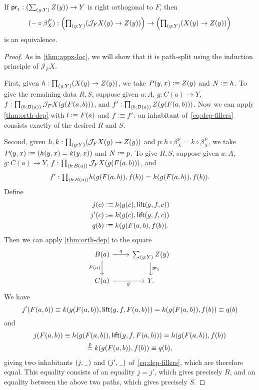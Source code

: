 \begin{lem}\label{thm:appx-factsys}
  If $\proj1 : (\sm{y:Y} Z(y)) \to Y$ is right orthogonal to $F$, then
  \[(-\circ \beta^F_X) : \Big(\prd{y:Y} (\mathcal{J}_F X(y) \to Z(y))\Big) \to \Big(\prd{y:Y} (X(y) \to Z(y))\Big) \]
  is an equivalence.
\end{lem}
\begin{proof}
  As in \cref{thm:appx-loc}, we will show that it is path-split using the induction principle of $\mathcal{J}_F X$.

  First, given $h:\prd{y:Y} (X(y) \to Z(y))$, we take $P(y,x) \vcentcolon\equiv Z(y)$ and $N\vcentcolon\equiv h$.
  To give the remaining data $R,S$, suppose given $a:A$, $g:C(a) \to Y$, $f:\prd{b:B(a)} \mathcal{J}_F X(g(F(a,b)))$, and $f':\prd{b:B(a)} Z(g(F(a,b)))$.
  Now we can apply \cref{thm:orth-dep} with $l\vcentcolon\equiv F(a)$ and $f\vcentcolon\equiv f'$: an inhabitant of~\eqref{eq:dep-fillers} consists exactly of the desired $R$ and $S$.

  Second, given $h,k:\prd{y:Y} (\mathcal{J}_F X(y) \to Z(y))$ and $p:h\circ \beta^F_X = k\circ \beta^F_X$, we take $P(y,x) \vcentcolon\equiv (h(y,x)=k(y,x))$ and $N\vcentcolon\equiv p$.
  To give $R,S$, suppose given $a:A$, $g:C(a) \to Y$, $f:\prd{b:B(a)} \mathcal{J}_F X(g(F(a,b)))$, and
  \[f':\prd{b:B(a)} h(g(F(a,b)),f(b))=k(g(F(a,b)),f(b)).\]
  Define
  \begin{align*}
    j(c) &\vcentcolon\equiv h(g(c),\mathsf{lift}(g,f,c))\\
    j'(c) &\vcentcolon\equiv k(g(c),\mathsf{lift}(g,f,c))\\
    q(b) &\vcentcolon\equiv k(g(F(a,b),f(b)).
  \end{align*}
  Then we can apply \cref{thm:orth-dep} to the square
  \[
  \begin{tikzcd}
    B(a) \ar[d,"F(a)"'] \ar[r,"q"] & \sm{y:Y} Z(y) \ar[d,"\proj1"] \\
    C(a) \ar[r,"g"'] & Y.
  \end{tikzcd}
  \]
  We have
  \[ j'(F(a,b)) \equiv k(g(F(a,b)),\mathsf{lift}(g,f,F(a,b))) = k(g(F(a,b)),f(b)) \equiv q(b) \]
  and
  \begin{multline*}
    j(F(a,b)) \equiv h(g(F(a,b)),\mathsf{lift}(g,f,F(a,b))) = h(g(F(a,b)),f(b))\\ \overset p= k(g(F(a,b)),f(b)) \equiv q(b),
  \end{multline*}
  giving two inhabitants $(j,\mathord{\hspace{1pt}\underline{\hspace{1ex}}\hspace{1pt}})$ and $(j',\mathord{\hspace{1pt}\underline{\hspace{1ex}}\hspace{1pt}})$ of~\eqref{eq:dep-fillers}, which are therefore equal.
  This equality consists of an equality $j=j'$, which gives precisely $R$, and an equality between the above two paths, which gives precisely $S$.
\end{proof}

